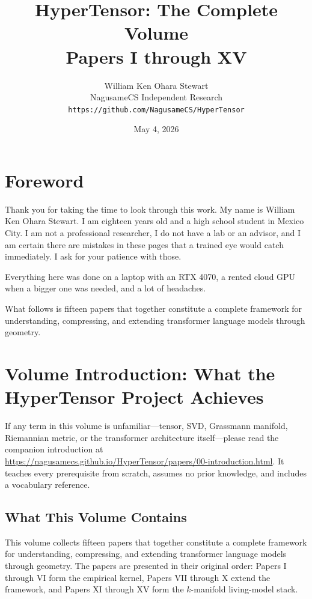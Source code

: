 \documentclass[11pt]{article}
\title{HyperTensor: The Complete Volume\\\large Papers I through XV}
\author{William Ken Ohara Stewart\\NagusameCS Independent Research\\\texttt{https://github.com/NagusameCS/HyperTensor}}
\date{May 4, 2026}
\begin{document}
\maketitle

\section*{Foreword}

Thank you for taking the time to look through this work. My name is William Ken Ohara Stewart. I am eighteen years old and a high school student in Mexico City. I am not a professional researcher, I do not have a lab or an advisor, and I am certain there are mistakes in these pages that a trained eye would catch immediately. I ask for your patience with those.

Everything here was done on a laptop with an RTX 4070, a rented cloud GPU when a bigger one was needed, and a lot of headaches.

What follows is fifteen papers that together constitute a complete framework for understanding, compressing, and extending transformer language models through geometry.

\section*{Volume Introduction: What the HyperTensor Project Achieves}

If any term in this volume is unfamiliar---tensor, SVD, Grassmann manifold, Riemannian metric, or the transformer architecture itself---please read the companion introduction at \url{https://nagusamecs.github.io/HyperTensor/papers/00-introduction.html}. It teaches every prerequisite from scratch, assumes no prior knowledge, and includes a vocabulary reference.

\subsection*{What This Volume Contains}

This volume collects fifteen papers that together constitute a complete framework for understanding, compressing, and extending transformer language models through geometry. The papers are presented in their original order: Papers I through VI form the empirical kernel, Papers VII through X extend the framework, and Papers XI through XV form the $k$-manifold living-model stack.
\end{document}

